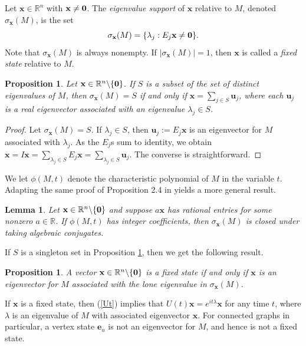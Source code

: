 \documentclass[11pt]{article}
\newtheorem{lemma}[theorem]{Lemma}
\newtheorem{proposition}[theorem]{Proposition}
\newcommand{\zero}{{\bf{0}}}
\newcommand{\be}{\mathbf e}
\newcommand{\bx}{\mathbf x}
\newcommand{\bu}{\mathbf u}
\def\R{\mathbb{R}}
\begin{document}
Let $\bx\in\R^n$ with $\bx\neq \zero$. The \textit{eigenvalue support} of $\bx$ relative to $M$, denoted $\sigma_{\bx}(M)$, is the set
\begin{equation*}
\sigma_{\bx}(M)=\{\lambda_j:E_j\bx\neq \zero\}.
\end{equation*}
Note that $\sigma_{\bx}(M)$ is always nonempty. If $|\sigma_{\bx}(M)|=1$, then $\bx$ is called a \textit{fixed state} relative to $M$.

\begin{proposition}
\label{Prop:S}
Let $\bx\in\R^n\backslash\{\zero\}$. If $S$ is a subset of the set of distinct eigenvalues of $M$, then $\sigma_{\bx}(M)=S$ if and only if $\bx=\sum_{j\in S}\bu_j$, where each $\bu_j$ is a real eigenvector associated with an eigenvalue $\lambda_j\in S$.
\end{proposition}

\begin{proof}
Let $\sigma_{\bx}(M)=S$. If $\lambda_j\in S$, then $\bu_j:=E_j\bx$ is an eigenvector for $M$ associated with $\lambda_j$. As the $E_j$s sum to identity, we obtain $\bx=I\bx=\sum_{\lambda_j\in S}E_j\bx=\sum_{\lambda_j\in S}\bu_j$. The converse is straightforward.
\end{proof}

We let $\phi(M,t)$ denote the characteristic polynomial of $M$ in the variable $t$. Adapting the same proof of Proposition 2.4 in \cite{kim2024generalization} yields a more general result.

\begin{lemma}
\label{Lem:suppalgconj}
Let $\bx\in\R^n\backslash\{\zero\}$ and suppose $a\bx$ has rational entries for some nonzero $a\in\R$. If $\phi(M,t)$ has integer coefficients, then $\sigma_{\bx}(M)$ is closed under taking algebraic conjugates.
\end{lemma}

If $S$ is a singleton set in Proposition \ref{Prop:S}, then we get the following result.

\begin{proposition}
\label{Prop:fixedstatechar}
A vector $\bx\in\R^n\backslash\{\zero\}$ is a fixed state if and only if $\bx$ is an eigenvector for $M$ associated with the lone eigenvalue in $\sigma_{\bx}(M)$.
\end{proposition}

If $\bx$ is a fixed state, then (\ref{Ut}) implies that $U(t)\bx=e^{it\lambda}\bx$ for any time $t$, where $\lambda$ is an eigenvalue of $M$ with associated eigenvector $\bx$. For connected graphs in particular, a vertex state $\be_u$ is not an eigenvector for $M$, and hence is not a fixed state.
\end{document}

